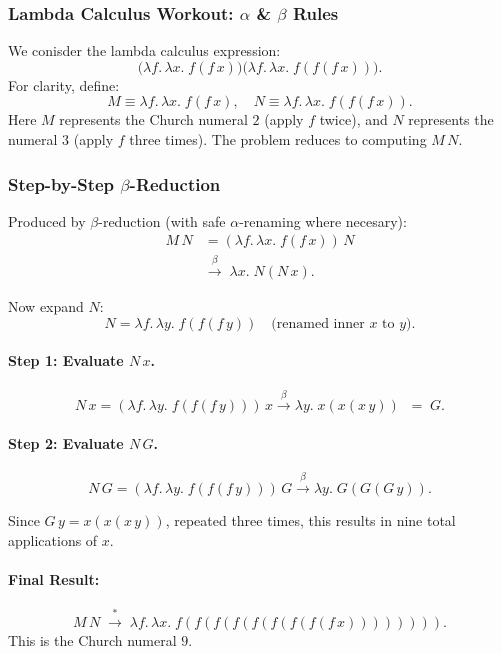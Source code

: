 \documentclass{article}
\theoremstyle{theorem}
\theoremstyle{definition}
\theoremstyle{remark}
\begin{document}
\subsubsection{Lambda Calculus Workout: \texorpdfstring{$\alpha$}{alpha} \& \texorpdfstring{$\beta$}{beta} Rules}

We conisder the lambda calculus expression:
\[
\bigl(\lambda f.\,\lambda x.\; f(f\,x)\bigr)
\bigl(\lambda f.\,\lambda x.\; f(f(f\,x))\bigr).
\]
For clarity, define:
\[
M \equiv \lambda f.\,\lambda x.\; f(f\,x),
\quad
N \equiv \lambda f.\,\lambda x.\; f(f(f\,x)).
\]
Here $M$ represents the Church numeral $2$ (apply $f$ twice), and $N$ represents the numeral $3$ (apply $f$ three times).
The problem reduces to computing $M\,N$.

\subsubsection{Step-by-Step \texorpdfstring{$\beta$}{beta}-Reduction}

Produced by $\beta$-reduction (with safe $\alpha$-renaming where necesary):
\begin{align*}
  M\,N 
  &= (\lambda f.\,\lambda x.\; f(f\,x))\,N \\[4pt]
  &\xrightarrow{\ \beta\ }\; \lambda x.\; N(N\,x).
  \end{align*}

Now expand $N$:
\[
N = \lambda f.\,\lambda y.\; f(f(f\,y)) \quad \text{(renamed inner $x$ to $y$)}.
\]

\paragraph{Step 1: Evaluate $N\,x$.}
\[
N\,x = (\lambda f.\,\lambda y.\; f(f(f\,y)))\,x
\xrightarrow{\ \beta\ } \lambda y.\; x(x(x\,y)) \;\;=\; G.
\]

\paragraph{Step 2: Evaluate $N\,G$.}
\[
N\,G = (\lambda f.\,\lambda y.\; f(f(f\,y)))\,G
\xrightarrow{\ \beta\ } \lambda y.\; G(G(G\,y)).
\]

Since $G\,y = x(x(x\,y))$, repeated three times, this results in nine total applications of $x$.

\paragraph{Final Result:}
\[
M\,N \;\xrightarrow{\ *\ }\; \lambda f.\,\lambda x.\;
f(f(f(f(f(f(f(f(f\,x)))))))).
\]
This is the Church numeral $9$.
\end{document}
